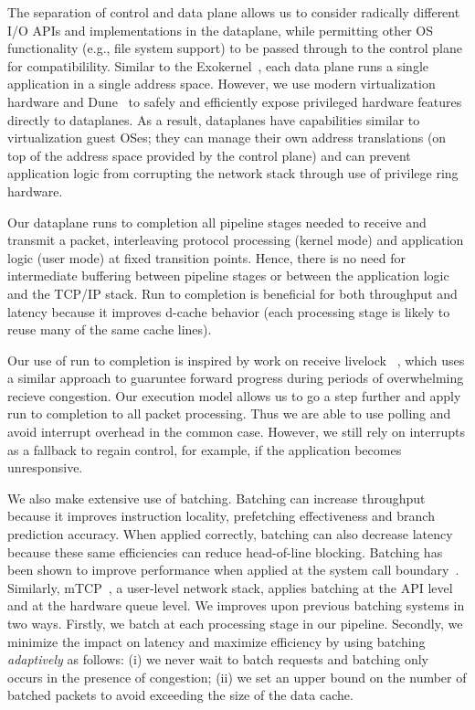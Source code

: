 The separation of control and data plane allows us to consider radically
different I/O APIs and implementations in the dataplane, while
permitting other OS functionality (e.g., file system
support) to be passed through to the control plane for compatibilility.
Similar to the
Exokernel~\cite{DBLP:conf/sosp/EnglerKO95}, each data plane runs a
single application in a single address space. However,
we use modern virtualization hardware and Dune~\cite{dune} to
safely and efficiently expose privileged hardware features directly to
dataplanes. As a result, dataplanes have capabilities similar to
virtualization guest OSes; they can manage
their own address translations (on top of the address space provided by
the control plane) and can prevent application logic from corrupting
the network stack through use of privilege ring hardware.



 Our dataplane
runs to completion all pipeline stages needed to receive and transmit a
packet, interleaving protocol processing (kernel mode) and application
logic (user mode) at fixed transition points. Hence, there is no need for intermediate
buffering between pipeline stages or between the application logic and
the TCP/IP stack. Run to completion is beneficial for both throughput
and latency because it improves d-cache behavior (each processing stage
is likely to reuse many of the same cache lines).

Our use of run to completion is inspired by work on receive livelock
~\cite{receive-livelock}, which uses a similar approach
to guaruntee forward progress during periods of overwhelming recieve congestion.
Our execution model allows us to go a step further and apply run to completion to
all packet processing. Thus we are able to use polling and avoid interrupt overhead
in the common case. However, we still rely on interrupts as a fallback to regain control,
for example, if the application becomes unresponsive.

We also make extensive use of batching. Batching can increase throughput because it
improves instruction locality, prefetching effectiveness and branch prediction accuracy.
When applied correctly, batching can also
decrease latency because these same efficiencies can reduce head-of-line blocking.
Batching has been shown to improve performance when applied at the system call
boundary~\cite{DBLP:conf/osdi/HanMCR12, DBLP:conf/osdi/SoaresS10}. Similarly,
mTCP~\cite{jeong2014mtcp}, a user-level network stack, applies batching
at the API level and at the hardware queue level.
We improves upon previous batching systems in two ways.
Firstly, we batch at each processing stage in our pipeline. Secondly, we
minimize the impact on latency and maximize efficiency by using batching
\emph{adaptively} as follows: (i) we never wait to batch requests and batching
only occurs in the presence of congestion; (ii) we set an upper bound on
the number of batched packets to avoid exceeding the size of the data cache.

